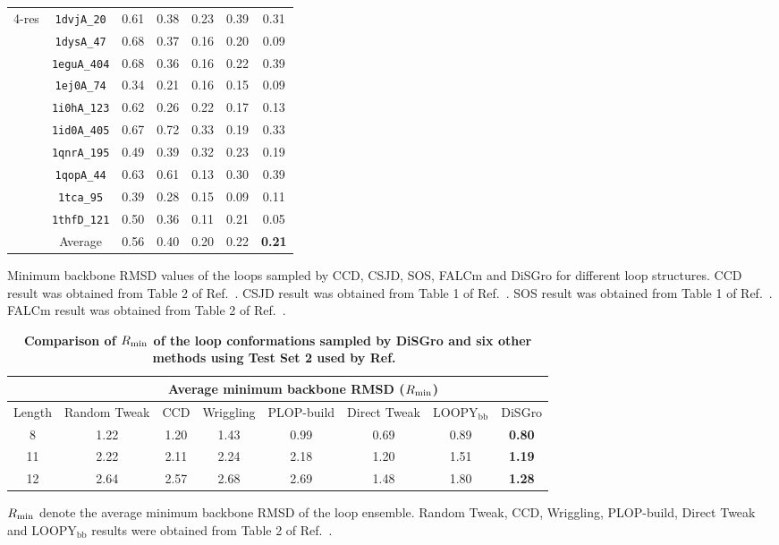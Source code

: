 \begin{table}[!h]
\begin{tabular}{|c|c||c|c|c|c||c|}
    \hline
    \hline
    4-res & {\tt 1dvjA\_20} & 0.61 & 0.38 & 0.23 & 0.39 & 0.31\\
     & {\tt 1dysA\_47} & 0.68 & 0.37 & 0.16 & 0.20 & 0.09\\
     & {\tt 1eguA\_404} & 0.68 & 0.36 & 0.16 & 0.22 & 0.39\\
     & {\tt 1ej0A\_74} & 0.34 & 0.21 & 0.16 & 0.15 & 0.09\\
     & {\tt 1i0hA\_123} & 0.62 & 0.26 & 0.22 & 0.17 & 0.13\\
     & {\tt 1id0A\_405} & 0.67 & 0.72 & 0.33 & 0.19 & 0.33\\
     & {\tt 1qnrA\_195} & 0.49 & 0.39 & 0.32 & 0.23 & 0.19\\
     & {\tt 1qopA\_44} & 0.63 & 0.61 & 0.13 & 0.30 & 0.39\\
     & {\tt 1tca\_95} & 0.39 & 0.28 & 0.15 & 0.09 & 0.11\\
     & {\tt 1thfD\_121} & 0.50 & 0.36 & 0.11 & 0.21 & 0.05\\
     \hline
     & Average & 0.56 & 0.40 & 0.20 & 0.22 & \textbf{0.21}\\
     \hline
\end{tabular}
\begin{flushleft}Minimum backbone RMSD values of the loops sampled by CCD, CSJD, SOS, FALCm and {\sc DiSGro} for different loop
structures. CCD result was obtained from Table 2 of
Ref.~\cite{canutescu2003}. CSJD result was obtained from Table 1 of
Ref.~\cite{coutsias2004}. SOS result was obtained from Table 1 of
Ref.~\cite{liu2009}. FALCm result was obtained from Table 2 of
Ref.~\cite{lee2010}.
\end{flushleft}
\label{tab:dunset}
\end{table}
\begin{table}[!h]
\caption{ \bf{Comparison of $R_{\rm min}$ of the loop conformations
sampled by {\sc DiSGro} and six other methods using Test Set 2 used
by Ref.~\cite{soto2008}}}
\begin{tabular}{|c|c|c|c|c|c|c|c|}
\hline \cline{1-4}
 & \multicolumn{7}{c|}{Average minimum backbone RMSD ($R_{\rm min}$)} \\
\hline
   Length & Random Tweak & CCD & Wriggling & PLOP-build & Direct Tweak  & $\mathrm{LOOPY_{bb}}$ & {\sc DiSGro} \\
\hline
     8 & 1.22 & 1.20 & 1.43 & 0.99 & 0.69 & 0.89 & \textbf{0.80}\\
    11 & 2.22 & 2.11 & 2.24 & 2.18 & 1.20 & 1.51 & \textbf{1.19}\\
    12 & 2.64 & 2.57 & 2.68 & 2.69 & 1.48 & 1.80 & \textbf{1.28}\\
\hline
\end{tabular}
\begin{flushleft}$R_{\rm min}$ denote the
average minimum backbone RMSD of the loop ensemble. Random Tweak,
CCD, Wriggling, PLOP-build, Direct Tweak and $\mathrm{LOOPY_{bb}}$
results were obtained from Table 2 of Ref.~\cite{soto2008}.
\end{flushleft}
\label{tab:sotobuilder}
\end{table}
